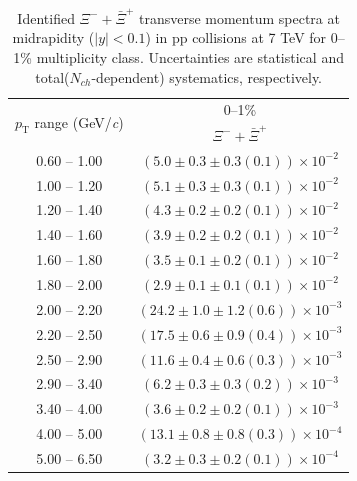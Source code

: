 \begin{table}
\caption{Identified $\Xi^{-} + \bar{\Xi}^{+}$ transverse momentum spectra at midrapidity ($|y|<0.1$) in pp collisions at 7 TeV for 0--1\% multiplicity class. Uncertainties are statistical and total($N_{ch}$-dependent) systematics, respectively.}
\label{tab:XiSum_0to1}
\begin{center}
\begin{tabular}{ c | c }
\hline
\multirow{2}{*}{$p_{\mathrm{T}}$ range (GeV/\textit{c})} & \multicolumn{1}{c}{0--1\%} \\ & $\Xi^{-} + \bar{\Xi}^{+}$\\ 
\hline
0.60 -- 1.00 & $(5.0\pm0.3\pm0.3(0.1))\times10^{-2}$ \\ 
1.00 -- 1.20 & $(5.1\pm0.3\pm0.3(0.1))\times10^{-2}$ \\ 
1.20 -- 1.40 & $(4.3\pm0.2\pm0.2(0.1))\times10^{-2}$ \\ 
1.40 -- 1.60 & $(3.9\pm0.2\pm0.2(0.1))\times10^{-2}$ \\ 
1.60 -- 1.80 & $(3.5\pm0.1\pm0.2(0.1))\times10^{-2}$ \\ 
1.80 -- 2.00 & $(2.9\pm0.1\pm0.1(0.1))\times10^{-2}$ \\ 
2.00 -- 2.20 & $(24.2\pm1.0\pm1.2(0.6))\times10^{-3}$ \\ 
2.20 -- 2.50 & $(17.5\pm0.6\pm0.9(0.4))\times10^{-3}$ \\ 
2.50 -- 2.90 & $(11.6\pm0.4\pm0.6(0.3))\times10^{-3}$ \\ 
2.90 -- 3.40 & $(6.2\pm0.3\pm0.3(0.2))\times10^{-3}$ \\ 
3.40 -- 4.00 & $(3.6\pm0.2\pm0.2(0.1))\times10^{-3}$ \\ 
4.00 -- 5.00 & $(13.1\pm0.8\pm0.8(0.3))\times10^{-4}$ \\ 
5.00 -- 6.50 & $(3.2\pm0.3\pm0.2(0.1))\times10^{-4}$ \\ 
\hline
\end{tabular}
\end{center}
\end{table}
 
